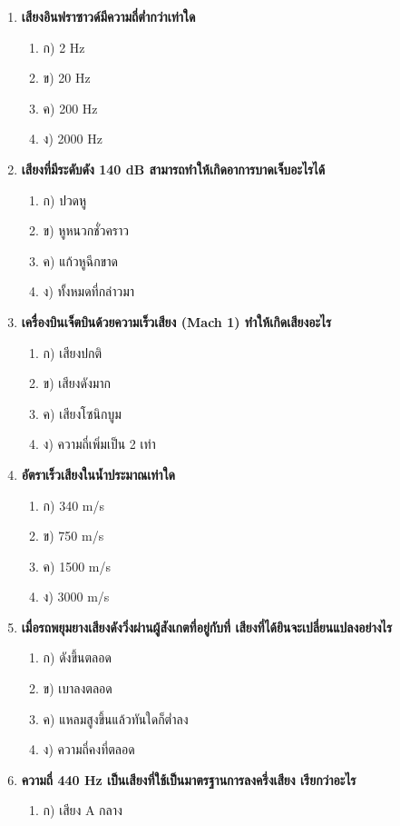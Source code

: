 \documentclass[12pt]{article}
\begin{document}
\begin{enumerate}
\begin{enumerate}
\end{enumerate}
\item \textbf{เสียงอินฟราซาวด์มีความถี่ต่ำกว่าเท่าใด}
\begin{enumerate}
\item ก) 2 Hz
\item ข) 20 Hz
\item ค) 200 Hz
\item ง) 2000 Hz
\end{enumerate}
\item \textbf{เสียงที่มีระดับดัง 140 dB สามารถทำให้เกิดอาการบาดเจ็บอะไรได้}
\begin{enumerate}
\item ก) ปวดหู
\item ข) หูหนวกชั่วคราว
\item ค) แก้วหูฉีกขาด
\item ง) ทั้งหมดที่กล่าวมา
\end{enumerate}
\item \textbf{เครื่องบินเจ็ตบินด้วยความเร็วเสียง (Mach 1) ทำให้เกิดเสียงอะไร}
\begin{enumerate}
\item ก) เสียงปกติ
\item ข) เสียงดังมาก
\item ค) เสียงโซนิกบูม
\item ง) ความถี่เพิ่มเป็น 2 เท่า
\end{enumerate}
\item \textbf{อัตราเร็วเสียงในน้ำประมาณเท่าใด}
\begin{enumerate}
\item ก) 340 m/s
\item ข) 750 m/s
\item ค) 1500 m/s
\item ง) 3000 m/s
\end{enumerate}
\item \textbf{เมื่อรถพยุมยางเสียงดังวิ่งผ่านผู้สังเกตที่อยู่กับที่ เสียงที่ได้ยินจะเปลี่ยนแปลงอย่างไร}
\begin{enumerate}
\item ก) ดังขึ้นตลอด
\item ข) เบาลงตลอด
\item ค) แหลมสูงขึ้นแล้วทันใดก็ต่ำลง
\item ง) ความถี่คงที่ตลอด
\end{enumerate}
\item \textbf{ความถี่ 440 Hz เป็นเสียงที่ใช้เป็นมาตรฐานการลงครึ่งเสียง เรียกว่าอะไร}
\begin{enumerate}
\item ก) เสียง A กลาง

\end{enumerate}
\end{enumerate}
\end{document}

